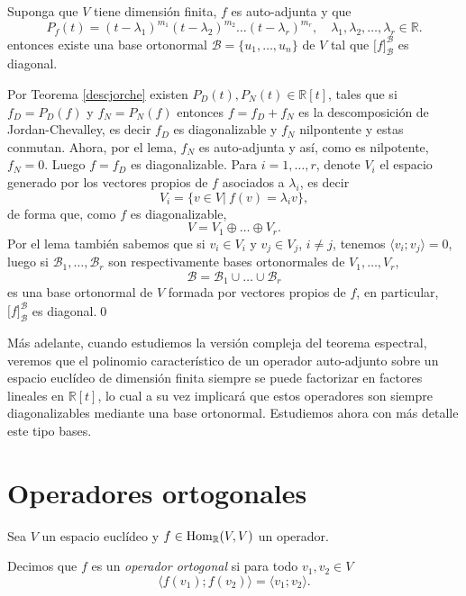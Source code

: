 \begin{teo}\label{teoesp} Suponga que $V$ tiene dimensi\'on finita, $f$ es auto-adjunta y que
\[
P_f(t)=(t-\lambda_1)^{m_1}(t-\lambda_2)^{m_2}\ldots(t-\lambda_r)^{m_r}, \quad \lambda_1,\lambda_2,\ldots,\lambda_r\in \mathbb{R}.
\]
entonces existe una base ortonormal $\mathcal{B}=\{u_1,\ldots,u_n\}$ de $V$ tal que $\Big[f\Big]^\mathcal{B}_\mathcal{B}$ es diagonal.
\end{teo}

\dem Por Teorema \ref{descjorche} existen $P_D(t),P_N(t)\in\mathbb{R}[t]$, tales que si $f_D=P_D(f)$ y $f_N=P_N(f)$ entonces $f=f_D+f_N$ es la descomposici\'on de Jordan-Chevalley, es decir $f_D$ es diagonalizable y $f_N$ nilpontente y estas conmutan. Ahora, por el lema, $f_N$ es auto-adjunta y as\'i, como es nilpotente, $f_N=0$. Luego $f=f_D$ es diagonalizable. Para $i=1,\ldots,r$, denote $V_i$ el espacio generado por los vectores propios de $f$ asociados a $\lambda_i$, es decir
\[
V_i=\{v\in V|\ f(v)=\lambda_iv\},
\]
de forma que, como $f$ es diagonalizable,
\[
V=V_1\oplus\ldots\oplus V_r.
\]
Por el lema tambi\'en sabemos que si $v_i\in V_i$ y $v_j\in V_j$, $i\ne j$, tenemos $\langle v_i;v_j \rangle=0$, luego si $\mathcal{B}_1,\ldots,\mathcal{B}_r$ son respectivamente bases ortonormales de $V_1,\ldots,V_r$,
\[
\mathcal{B}=\mathcal{B}_1\cup\ldots\cup \mathcal{B}_r
\]
es una base ortonormal de $V$ formada por vectores propios de $f$, en particular, $\Big[f\Big]^\mathcal{B}_\mathcal{B}$ es diagonal.\qed

\begin{obs}
M\'as adelante, cuando estudiemos la versi\'on compleja del teorema espectral, veremos que el polinomio caracter\'istico de un operador auto-adjunto sobre un espacio eucl\'ideo de dimensi\'on finita siempre se puede factorizar en factores lineales en $\mathbb{R}[t]$, lo cual a su vez implicar\'a que estos operadores son siempre diagonalizables mediante una base ortonormal. Estudiemos ahora con m\'as detalle este tipo bases.
\end{obs}

\section{Operadores ortogonales}

Sea $V$ un espacio eucl\'ideo y $f\in\operatorname{Hom}_\mathbb{R}(V,V)$ un operador.

\begin{defn}
Decimos que $f$ es un \emph{operador ortogonal} si para todo $v_1,v_2\in V$
\[
\langle f(v_1);f(v_2) \rangle =\langle v_1;v_2\rangle.
\]
\end{defn}

